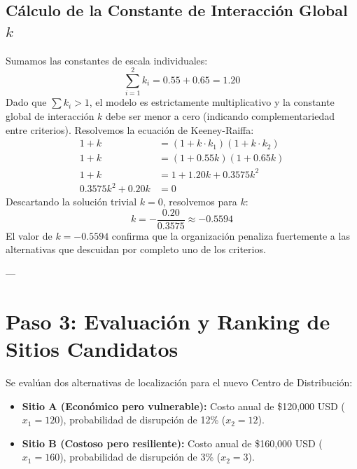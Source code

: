 \documentclass[11pt, letterpaper]{article}
\begin{document}
\subsection{Cálculo de la Constante de Interacción Global $k$}
Sumamos las constantes de escala individuales:
\begin{equation}
    \sum_{i=1}^2 k_i = 0.55 + 0.65 = 1.20
\end{equation}
Dado que $\sum k_i > 1$, el modelo es estrictamente multiplicativo y la constante global de interacción $k$ debe ser menor a cero (indicando complementariedad entre criterios). Resolvemos la ecuación de Keeney-Raiffa:
\begin{align}
    1 + k &= (1 + k \cdot k_1)(1 + k \cdot k_2) \nonumber \\
    1 + k &= (1 + 0.55 k)(1 + 0.65 k) \nonumber \\
    1 + k &= 1 + 1.20 k + 0.3575 k^2 \nonumber \\
    0.3575 k^2 + 0.20 k &= 0
\end{align}
Descartando la solución trivial $k = 0$, resolvemos para $k$:
\begin{equation}
    k = -\frac{0.20}{0.3575} \approx -0.5594
\end{equation}
El valor de $k = -0.5594$ confirma que la organización penaliza fuertemente a las alternativas que descuidan por completo uno de los criterios.

---

\section{Paso 3: Evaluación y Ranking de Sitios Candidatos}

Se evalúan dos alternativas de localización para el nuevo Centro de Distribución:
\begin{itemize}
    \item \textbf{Sitio A (Económico pero vulnerable):} Costo anual de \$120,000 USD ($x_1 = 120$), probabilidad de disrupción de 12\% ($x_2 = 12$).
    \item \textbf{Sitio B (Costoso pero resiliente):} Costo anual de \$160,000 USD ($x_1 = 160$), probabilidad de disrupción de 3\% ($x_2 = 3$).
\end{itemize}
\end{document}
